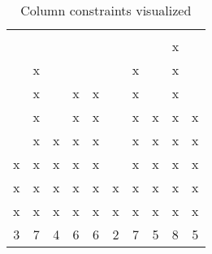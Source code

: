 \documentclass[paper=a4, fontsize=11pt]{scrartcl} %
\numberwithin{figure}{section} %
\numberwithin{table}{section} %
\begin{document}
\FloatBarrier

\begin{table}[!th]
\centering
\begin{tabular}{|c|c|c|c|c|c|c|c|c|c|}
\hline
&&&&&&&&& \\
\hline
&&&&&&&&& \\
\hline
&&&&&&&&x& \\
\hline
&x&&&&&x&&x& \\
\hline
&x&&x&x&&x&&x& \\
\hline
&x&&x&x&&x&x&x&x \\
\hline
&x&x&x&x&&x&x&x&x \\
\hline
x&x&x&x&x&&x&x&x&x \\
\hline
x&x&x&x&x&x&x&x&x&x \\
\hline
x&x&x&x&x&x&x&x&x&x \\
\hline
\hline
3&7&4&6&6&2&7&5&8&5

\end{tabular}
\caption{Column constraints visualized}
\label{ex:table}
\end{table}

\FloatBarrier
\end{document}
